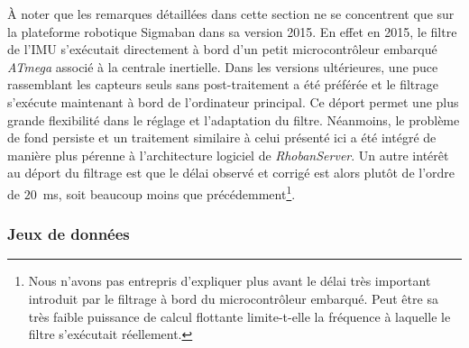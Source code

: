 À noter que les remarques détaillées dans cette section ne se concentrent 
que sur la plateforme robotique Sigmaban dans sa version 2015.
En effet en 2015, le filtre de l'IMU s'exécutait directement à bord d'un petit
microcontrôleur embarqué \textit{ATmega} associé à la centrale inertielle.
Dans les versions ultérieures, une puce rassemblant les capteurs seuls 
sans post-traitement a été préférée et le filtrage s'exécute maintenant 
à bord de l'ordinateur principal.
Ce déport permet une plus grande flexibilité dans le réglage et l'adaptation du filtre.
Néanmoins, le problème de fond persiste et un traitement similaire à celui présenté ici 
a été intégré de manière plus pérenne à l'architecture logiciel de \textit{RhobanServer}.
Un autre intérêt au déport du filtrage est que le délai observé et corrigé 
est alors plutôt de l'ordre de $20$~ms, 
soit beaucoup moins que précédemment\footnote{Nous n'avons pas entrepris d'expliquer plus avant 
le délai très important introduit par le filtrage à bord du microcontrôleur embarqué. 
Peut être sa très faible puissance de calcul flottante limite-t-elle
la fréquence à laquelle le filtre s'exécutait réellement.}.

\subsubsection{Jeux de données}


